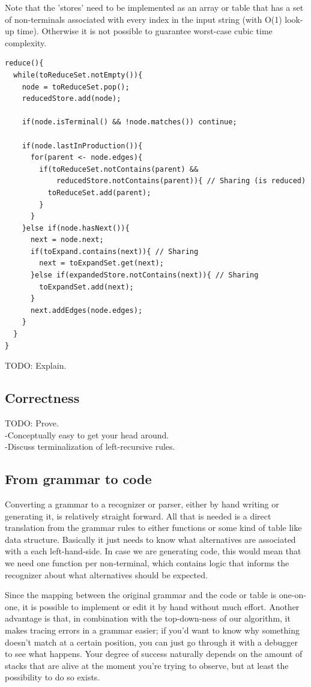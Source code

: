 \documentclass[a4paper,10pt]{article}
\begin{document}
Note that the 'stores' need to be implemented as an array or table that has a set of non-terminals associated with every index in the input string (with O(1) look-up time). Otherwise it is not possible to guarantee worst-case cubic time complexity.

{\small
\begin{verbatim}
reduce(){
  while(toReduceSet.notEmpty()){
    node = toReduceSet.pop();
    reducedStore.add(node);
    
    if(node.isTerminal() && !node.matches()) continue;
    
    if(node.lastInProduction()){
      for(parent <- node.edges){
        if(toReduceSet.notContains(parent) &&
            reducedStore.notContains(parent)){ // Sharing (is reduced)
          toReduceSet.add(parent);
        }
      }
    }else if(node.hasNext()){
      next = node.next;
      if(toExpand.contains(next)){ // Sharing
        next = toExpandSet.get(next);
      }else if(expandedStore.notContains(next)){ // Sharing
        toExpandSet.add(next);
      }
      next.addEdges(node.edges);
    }
  }
}
\end{verbatim}
}

TODO: Explain.

\subsection{Correctness}

TODO: Prove.\\
-Conceptually easy to get your head around.\\
-Discuss terminalization of left-recursive rules.

\subsection{From grammar to code}

Converting a grammar to a recognizer or parser, either by hand writing or generating it, is relatively straight forward. All that is needed is a direct translation from the grammar rules to either functions or some kind of table like data structure. Basically it just needs to know what alternatives are associated with a each left-hand-side. In case we are generating code, this would mean that we need one function per non-terminal, which contains logic that informs the recognizer about what alternatives should be expected.

Since the mapping between the original grammar and the code or table is one-on-one, it is possible to implement or edit it by hand without much effort. Another advantage is that, in combination with the top-down-ness of our algorithm, it makes tracing errors in a grammar easier; if you'd want to know why something doesn't match at a certain position, you can just go through it with a debugger to see what happens. Your degree of success naturally depends on the amount of stacks that are alive at the moment you're trying to observe, but at least the possibility to do so exists.
\end{document}
